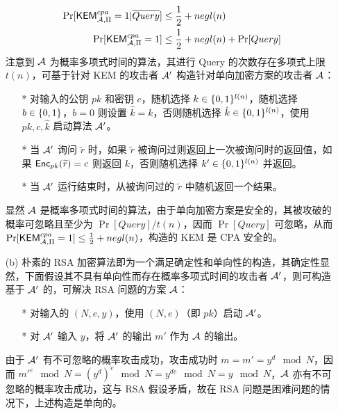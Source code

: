 \begin{questions}
\begin{solution}
\begin{enumerate}
                    \begin{equation}
                        \begin{aligned}
                            \Pr[\mathsf{KEM}^{cpa}_{\mathcal{A},\Pi}=1|\overline{Query}]&\leq\frac{1}{2}+negl(n)\\
                            \Pr[\mathsf{KEM}^{cpa}_{\mathcal{A},\Pi}=1]&\leq\frac{1}{2}+negl(n)+\Pr[Query]
                        \end{aligned}
                    \end{equation}
                    注意到 $\mathcal{A}$ 为概率多项式时间的算法，其进行 Query 的次数存在多项式上限 $t(n)$，可基于针对 KEM 的攻击者 $\mathcal{A}'$ 构造针对单向加密方案的攻击者 $\mathcal{A}$：
                    \begin{enumerate}
                        \item[*] 对输入的公钥 $pk$ 和密钥 $c$，随机选择 $k\in\{{0,1}\}^{l(n)}$，随机选择 $b\in\{{0,1}\}$，$b=0$ 则设置 $\hat{k}=k$，否则随机选择 $\hat{k}\in\{{0,1}\}^{l(n)}$，使用 $pk,c,\hat{k}$ 启动算法 $\mathcal{A}'$。
                        \item[*] 当 $\mathcal{A}'$ 询问 $\widetilde{r}$ 时，如果 $\widetilde{r}$ 被询问过则返回上一次被询问时的返回值，如果 $\mathsf{Enc}_{pk}(\widetilde{r})=c$ 则返回 $k$，否则随机选择 $k'\in\{{0,1}\}^{l(n)}$ 并返回。
                        \item[*] 当 $\mathcal{A}'$ 运行结束时，从被询问过的 $\widetilde{r}$ 中随机返回一个结果。
                    \end{enumerate}
                    显然 $\mathcal{A}$ 是概率多项式时间的算法，由于单向加密方案是安全的，其被攻破的概率可忽略且至少为 $\Pr[Query]/t(n)$，因而 $\Pr[Query]$ 可忽略，从而 $\Pr[\mathsf{KEM}^{cpa}_{\mathcal{A},\Pi}=1]\leq\frac{1}{2}+negl(n)$，构造的 KEM 是 CPA 安全的。
                \item[(b)] 朴素的 RSA 加密算法即为一个满足确定性和单向性的构造，其确定性显然，下面假设其不具有单向性而存在概率多项式时间的攻击者 $\mathcal{A}'$，则可构造基于 $\mathcal{A}'$ 的，可解决 RSA 问题的方案 $\mathcal{A}$：
                    \begin{enumerate}
                        \item[*] 对输入的 $(N,e,y)$，使用 $(N,e)$（即 $pk$）启动 $\mathcal{A}'$。
                        \item[*] 对 $\mathcal{A}'$ 输入 $y$，将 $\mathcal{A}'$ 的输出 $m'$ 作为 $\mathcal{A}$ 的输出。
                    \end{enumerate}
                由于 $\mathcal{A}'$ 有不可忽略的概率攻击成功，攻击成功时 $m=m'=y^d\mod{N}$，因而 $m'^e\mod{N}=(y^d)^e\mod{N}=y^{de}\mod{N}=y\mod{N}$，$\mathcal{A}$ 亦有不可忽略的概率攻击成功，这与 RSA 假设矛盾，故在 RSA 问题是困难问题的情况下，上述构造是单向的。
            \end{enumerate}
        \end{solution}


\end{questions}
